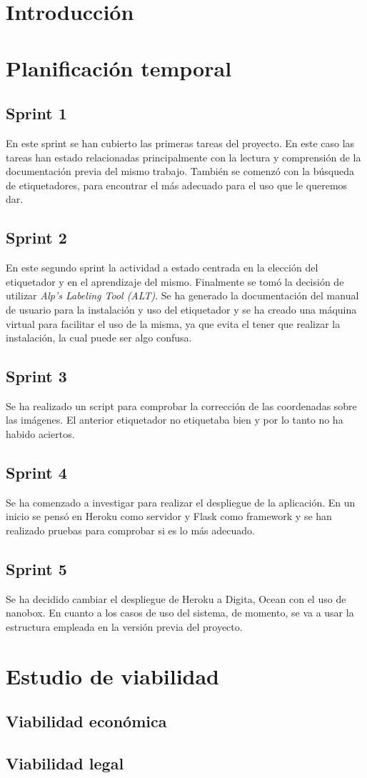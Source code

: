 
\section{Introducción}

\section{Planificación temporal}
\subsection{Sprint 1}
En este sprint se han cubierto las primeras tareas del proyecto. En este caso las tareas han estado relacionadas principalmente con la lectura y comprensión de la documentación previa del mismo trabajo.
También se comenzó con la búsqueda de etiquetadores, para encontrar el más adecuado para el uso que le queremos dar.
\subsection{Sprint 2}
En este segundo sprint la actividad a estado centrada en la elección del etiquetador y en el aprendizaje del mismo. Finalmente se tomó la decisión de utilizar \textit{Alp’s Labeling Tool (ALT)}. 
Se ha generado la documentación del manual de usuario para la instalación y uso del etiquetador y se ha creado una máquina virtual para facilitar el uso de la misma, ya que evita el tener que realizar la instalación, la cual puede ser algo confusa.
\subsection{Sprint 3}
Se ha realizado un script para comprobar la corrección de las coordenadas sobre las imágenes. El anterior etiquetador no etiquetaba bien y por lo tanto no ha habido aciertos.
\subsection{Sprint 4}
Se ha comenzado a investigar para realizar el despliegue de la aplicación. En un inicio se pensó en Heroku como servidor y Flask como framework y se han realizado pruebas para comprobar si es lo más adecuado. 
\subsection{Sprint 5}
Se ha decidido cambiar el despliegue de Heroku a Digita, Ocean con el uso de nanobox. En cuanto a los casos de uso del sistema, de momento, se va a usar la estructura empleada en la versión previa del proyecto.
\section{Estudio de viabilidad}

\subsection{Viabilidad económica}

\subsection{Viabilidad legal}


